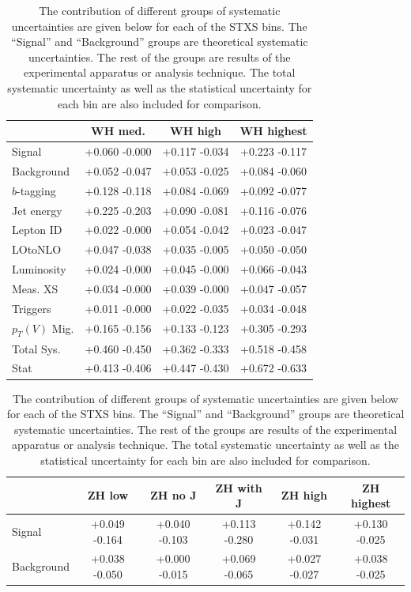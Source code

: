\begin{table}
  \centering
  \caption[Contributions of systematic uncertainties groups to result]{
    The contribution of different groups of systematic uncertainties are given below for each of the STXS bins.
    The ``Signal'' and ``Background'' groups are theoretical systematic uncertainties.
    The rest of the groups are results of the experimental apparatus or analysis technique.
    The total systematic uncertainty as well as the statistical uncertainty for each bin are also included
    for comparison.
  }
  \begin{tabular}{|l|c|c|c|}
    \hline
& WH med. & WH high & WH highest \\
\hline
Signal & {+0.060} {-0.000} & {+0.117} {-0.034} & {+0.223} {-0.117}\\
Background & {+0.052} {-0.047} & {+0.053} {-0.025} & {+0.084} {-0.060}\\
\hline
$b$-tagging & {+0.128} {-0.118} & {+0.084} {-0.069} & {+0.092} {-0.077}\\
Jet energy & {+0.225} {-0.203} & {+0.090} {-0.081} & {+0.116} {-0.076}\\
Lepton ID & {+0.022} {-0.000} & {+0.054} {-0.042} & {+0.023} {-0.047}\\
LOtoNLO & {+0.047} {-0.038} & {+0.035} {-0.005} & {+0.050} {-0.050}\\
Luminosity & {+0.024} {-0.000} & {+0.045} {-0.000} & {+0.066} {-0.043}\\
Meas. XS & {+0.034} {-0.000} & {+0.039} {-0.000} & {+0.047} {-0.057}\\
Triggers & {+0.011} {-0.000} & {+0.022} {-0.035} & {+0.034} {-0.048}\\
$p_T(V)$ Mig. & {+0.165} {-0.156} & {+0.133} {-0.123} & {+0.305} {-0.293}\\
\hline
Total Sys. & {+0.460} {-0.450} & {+0.362} {-0.333} & {+0.518} {-0.458}\\
Stat & {+0.413} {-0.406} & {+0.447} {-0.430} & {+0.672} {-0.633}\\
\hline
  \end{tabular}
  \begin{tabular}{|l|c|c|c|c|c|}
    \hline
& ZH low & ZH no J & ZH with J & ZH high & ZH highest \\
\hline
Signal & {+0.049} {-0.164} & {+0.040} {-0.103} & {+0.113} {-0.280} & {+0.142} {-0.031} & {+0.130} {-0.025}\\
Background & {+0.038} {-0.050} & {+0.000} {-0.015} & {+0.069} {-0.065} & {+0.027} {-0.027} & {+0.038} {-0.025}\\

\end{tabular}
\end{table}
